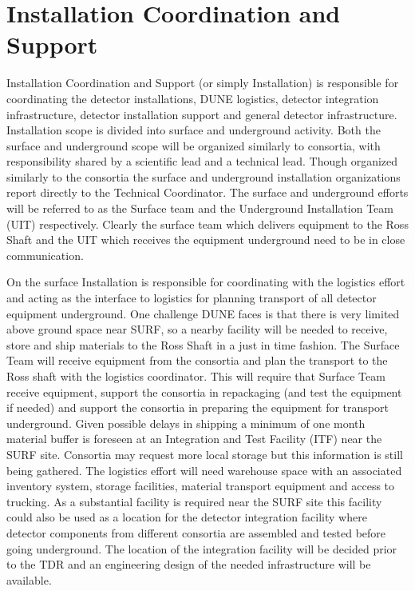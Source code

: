 \section{Installation Coordination and Support}
\label{sec:fdsp-coord-install}


Installation Coordination and Support (or simply Installation) is
responsible for coordinating the detector installations, DUNE
logistics, detector integration infrastructure, detector installation
support and general detector infrastructure. Installation scope is
divided into surface and underground activity. Both the surface and
underground scope will be organized similarly to consortia, with
responsibility shared by a scientific lead and a technical
lead. Though organized similarly to the consortia the surface and
underground installation organizations report directly to the
Technical Coordinator. The surface and underground efforts will be
referred to as the Surface team and the Underground Installation Team
(UIT) respectively. Clearly the surface team which delivers equipment
to the Ross Shaft and the UIT which receives the equipment underground
need to be in close communication.


On the surface Installation is responsible for coordinating with the
 logistics effort and acting as the interface to
 logistics for planning transport of all detector
equipment underground. One challenge DUNE faces is that there is very
limited above ground space near SURF, so a nearby facility will be
needed to receive, store and ship materials to the Ross Shaft in a
just in time fashion. The Surface Team will receive equipment from the
consortia and plan the transport to the Ross shaft with the
 logistics coordinator. This will require that Surface
Team receive equipment, support the consortia in repackaging (and test
the equipment if needed) and support the consortia in preparing the
equipment for transport underground. Given possible delays in shipping
a minimum of one month material buffer is foreseen at an Integration
and Test Facility (ITF) near the SURF site. Consortia may request more
local storage but this information is still being gathered. The
logistics effort will need warehouse space with an associated
inventory system, storage facilities, material transport equipment and
access to trucking. As a substantial facility is required near the
SURF site this facility could also be used as a location for the
detector integration facility where detector components from different
consortia are assembled and tested before going underground. The
location of the integration facility will be decided prior to the TDR
and an engineering design of the needed infrastructure will be
available.

